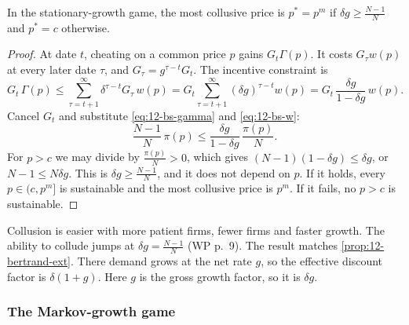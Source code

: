 \begin{proposition}\label{prop:12-bs-stationary}
In the stationary-growth game, the most collusive price is $p^* = p^m$ if $\delta g \ge \frac{N-1}{N}$ and $p^* = c$
otherwise.
\end{proposition}

\begin{proof}
At date $t$, cheating on a common price $p$ gains $G_t\Gamma(p)$. It costs $G_\tau w(p)$ at every later date $\tau$, and
$G_\tau = g^{\tau - t}G_t$. The incentive constraint is
\begin{equation*}
G_t\,\Gamma(p) \le \sum_{\tau = t+1}^{\infty}\delta^{\tau - t}G_\tau\, w(p) = G_t\sum_{\tau = t+1}^{\infty}(\delta g)^{\tau - t}w(p)
= G_t\,\frac{\delta g}{1 - \delta g}\,w(p).
\end{equation*}
Cancel $G_t$ and substitute \eqref{eq:12-bs-gamma} and \eqref{eq:12-bs-w}:
\begin{equation*}
\frac{N-1}{N}\,\pi(p) \le \frac{\delta g}{1 - \delta g}\,\frac{\pi(p)}{N}.
\end{equation*}
For $p > c$ we may divide by $\frac{\pi(p)}{N} > 0$, which gives $(N-1)(1 - \delta g) \le \delta g$, or $N - 1 \le N\delta g$. This is
$\delta g \ge \frac{N-1}{N}$, and it does not depend on $p$. If it holds, every $p \in (c, p^m]$ is sustainable and the most
collusive price is $p^m$. If it fails, no $p > c$ is sustainable.
\end{proof}

Collusion is easier with more patient firms, fewer firms and faster growth. The ability to collude jumps at
$\delta g = \frac{N-1}{N}$ (WP p.~9). The result matches \cref{prop:12-bertrand-ext}. There demand grows at the net rate
$g$, so the effective discount factor is $\delta(1+g)$. Here $g$ is the gross growth factor, so it is $\delta g$.

\subsubsection{The Markov-growth game}

